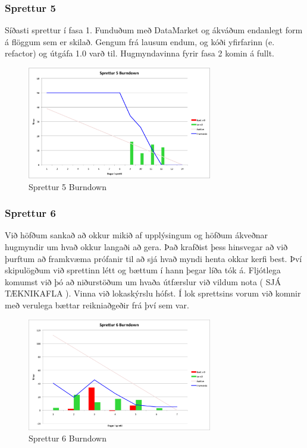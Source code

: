 \documentclass{article}
\begin{document}
\subsubsection{Sprettur 5}
Síðasti sprettur í fasa 1. Funduðum með DataMarket og ákváðum endanlegt form á flöggum sem er skilað. Gengum frá lausum endum, og kóði yfirfarinn 
(e. refactor) og útgáfa 1.0 varð til. Hugmyndavinna fyrir fasa 2 komin á fullt.

\begin{figure}[H]
 \centering
 \includegraphics[width=0.72\textwidth]{Sprettur5_Burndown.png}
 \caption{Sprettur 5 Burndown}
\end{figure}

\subsubsection{Sprettur 6}
Við höfðum sankað að okkur mikið af upplýsingum og höfðum ákveðnar hugmyndir um hvað okkur langaði að gera. Það krafðist þess hinsvegar að við 
þurftum að framkvæma prófanir til að sjá hvað myndi henta okkar kerfi best. Því skipulögðum við sprettinn létt og bættum í hann þegar líða tók á. 
Fljótlega komumst við þó að niðurstöðum um hvaða útfærslur við vildum nota ( SJÁ TÆKNIKAFLA ). Vinna við lokaskýrslu hófst. Í lok sprettsins 
vorum við komnir með verulega bættar reikniaðgeðir frá því sem var.

\begin{figure}[H]
 \centering
 \includegraphics[width=0.72\textwidth]{Sprettur6_Burndown.png}
 \caption{Sprettur 6 Burndown}
\end{figure}
\end{document}

